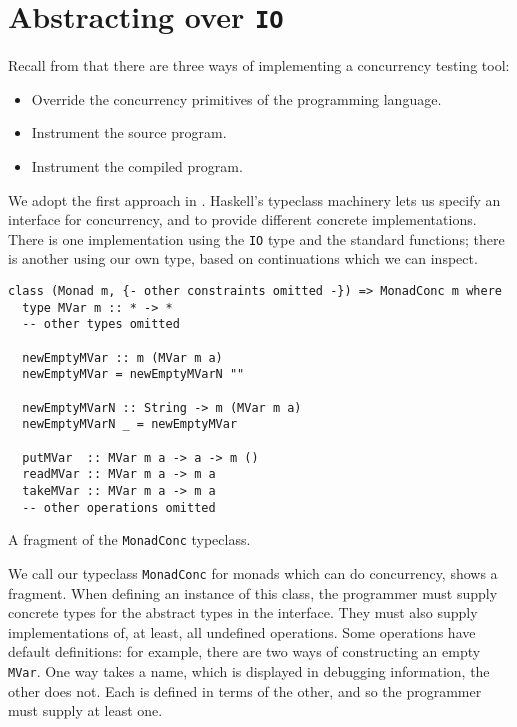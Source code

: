 \section{Abstracting over \texttt{IO}}
\label{sec:dejafu-monadconc}

Recall from  that there are three ways of implementing
a concurrency testing tool:

\begin{itemize}
\item Override the concurrency primitives of the programming language.
\item Instrument the source program.
\item Instrument the compiled program.
\end{itemize}

We adopt the first approach in \dejafu{}.  Haskell's typeclass machinery lets us
specify an interface for concurrency, and to provide different concrete
implementations.  There is one implementation using the \verb|IO| type and the
standard functions; there is another using our own type, based on continuations
which we can inspect.

\begin{listing}
  \begin{verbatim}
class (Monad m, {- other constraints omitted -}) => MonadConc m where
  type MVar m :: * -> *
  -- other types omitted

  newEmptyMVar :: m (MVar m a)
  newEmptyMVar = newEmptyMVarN ""

  newEmptyMVarN :: String -> m (MVar m a)
  newEmptyMVarN _ = newEmptyMVar

  putMVar  :: MVar m a -> a -> m ()
  readMVar :: MVar m a -> m a
  takeMVar :: MVar m a -> m a
  -- other operations omitted
  \end{verbatim}
  \caption{A fragment of the \texttt{MonadConc} typeclass.}\label{lst:monadconc}
\end{listing}

We call our typeclass \verb|MonadConc| for monads which can do concurrency,
 shows a fragment.  When defining an instance of this class,
the programmer must supply concrete types for the abstract types in the
interface.  They must also supply implementations of, at least, all undefined
operations.  Some operations have default definitions: for example, there are
two ways of constructing an empty \verb|MVar|.  One way takes a name, which is
displayed in debugging information, the other does not.  Each is defined in
terms of the other, and so the programmer must supply at least one.

